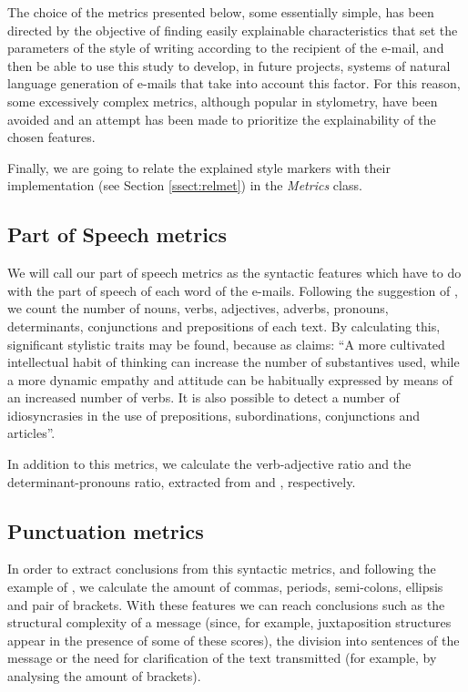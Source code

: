 The choice of the metrics presented below, some essentially simple, has been directed by the objective of finding easily explainable characteristics that set the parameters of the style of writing according to the recipient of the e-mail, and then be able to use this study to develop, in future projects, systems of natural language generation of e-mails that take into account this factor. For this reason, some excessively complex metrics, although popular in stylometry, have been avoided and an attempt has been made to prioritize the explainability of the chosen features.

Finally, we are going to relate the explained style markers with their implementation (see Section \ref{ssect:relmet}) in the \textit{Metrics} class.

\subsection{Part of Speech metrics}\label{ssect:posf}

We will call our part of speech metrics as the syntactic features which have to do with the part of speech of each word of the e-mails. Following the suggestion of \cite{holmes1985analysis}, we count the number of nouns, verbs, adjectives, adverbs, pronouns, determinants, conjunctions and prepositions of each text. By calculating this, significant stylistic traits may be found, because as \cite{somers1966statistical} claims: ``A more cultivated intellectual habit of thinking can increase the number of substantives used, while a more dynamic empathy and attitude can be habitually expressed by means of an increased number of verbs. It is also possible to detect a number of idiosyncrasies in the use of prepositions, subordinations, conjunctions and articles''.

In addition to this metrics, we calculate the verb-adjective ratio and the determinant-pronouns ratio, extracted from \cite{antosch1969diagnosis} and \cite{brainerd1974weighting}, respectively.

\subsection{Punctuation metrics}\label{ssect:punctf}

In order to extract conclusions from this syntactic metrics, and following the example of \cite{calix2008stylometry}, we calculate the amount of commas, periods, semi-colons, ellipsis and pair of brackets. With these features we can reach conclusions such as the structural complexity of a message (since, for example, juxtaposition structures appear in the presence of some of these scores), the division into sentences of the message or the need for clarification of the text transmitted (for example, by analysing the amount of brackets).

